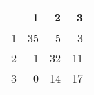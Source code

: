 \begin{tabular}{rrrr}
  \hline
 & 1 & 2 & 3 \\ 
  \hline
1 &  35 &   5 &   3 \\ 
  2 &   1 &  32 &  11 \\ 
  3 &   0 &  14 &  17 \\ 
   \hline
\end{tabular}
